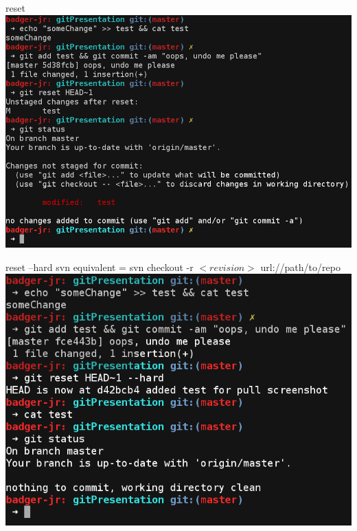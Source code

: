 \begin{frame}
	\begin{block}{reset}
		\includegraphics[width=\textwidth]{./images/reset.png}
	\end{block}
\end{frame}
\begin{frame}
	\begin{block}{reset --hard}
		svn equivalent = svn checkout -r $<revision>$ url://path/to/repo
		\includegraphics[width=\textwidth]{./images/resetHard.png}
	\end{block}
\end{frame}
